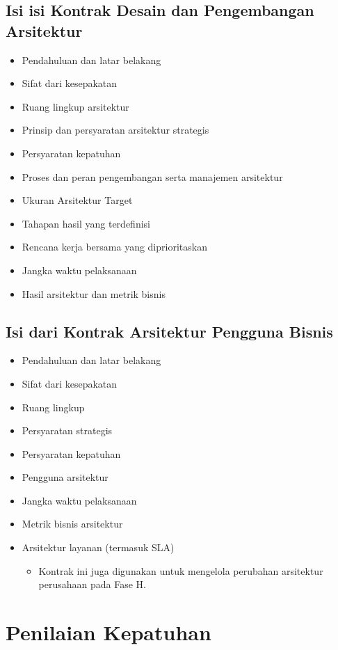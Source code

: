 \subsection{Isi isi Kontrak Desain dan Pengembangan Arsitektur}
\begin{itemize}
	\item Pendahuluan dan latar belakang
	\item Sifat dari kesepakatan
	\item Ruang lingkup arsitektur
	\item Prinsip dan persyaratan arsitektur strategis
	\item Persyaratan kepatuhan
	\item Proses dan peran pengembangan serta manajemen arsitektur
	\item Ukuran Arsitektur Target
	\item Tahapan hasil yang terdefinisi
	\item Rencana kerja bersama yang diprioritaskan
	\item Jangka waktu pelaksanaan
	\item Hasil arsitektur dan metrik bisnis
\end{itemize}

\subsection{Isi dari Kontrak Arsitektur Pengguna Bisnis}
\begin{itemize}
	\item Pendahuluan dan latar belakang
	\item Sifat dari kesepakatan
	\item Ruang lingkup
	\item Persyaratan strategis
	\item Persyaratan kepatuhan
	\item Pengguna arsitektur
	\item Jangka waktu pelaksanaan
	\item Metrik bisnis arsitektur
	\item Arsitektur layanan (termasuk SLA)
	\begin{itemize}
		\item Kontrak ini juga digunakan untuk mengelola perubahan arsitektur perusahaan pada Fase H.
	\end{itemize}
\end{itemize}

\section{Penilaian Kepatuhan}

